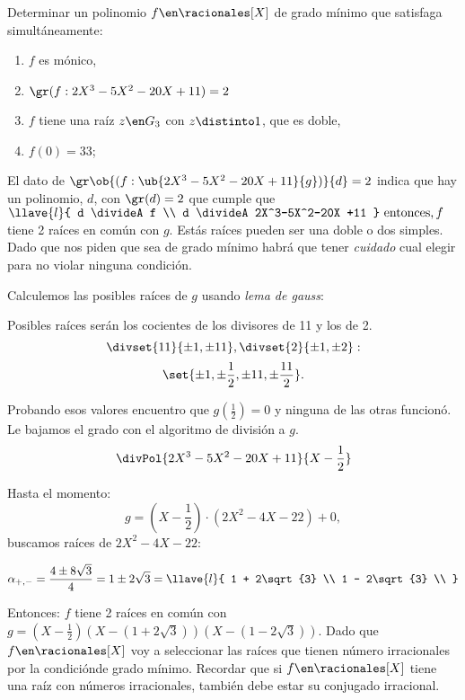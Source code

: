 \begin{enunciado}{\ejExtra}
  Determinar un polinomio $f \en \racionales[X]$ de grado mínimo que satisfaga
  simultáneamente:\par

  \begin{enumerate}[label=$\scriptscriptstyle\blacksquare$]
    \item $f$ es mónico,
    \item $\gr(f:2X^3-5X^2-20X +11) = 2$
    \item $f$ tiene una raíz $z \en G_3$ con $z \distinto 1$, que es doble,
    \item $f(0) = 33$;
  \end{enumerate}
\end{enunciado}

El dato de
$\gr\ob{(f:\ub{2X^3-5X^2-20X +11}{g})}{d} = 2$ indica que hay un polinomio,
$d$, con $\gr(d) = 2$ que cumple que
$
  \llave{l}{
    d \divideA f \\
    d \divideA 2X^3-5X^2-20X +11
  } \text{ entonces,}\, f
$ tiene 2 raíces en común con $g$. Estás raíces pueden ser una doble o dos simples. Dado que nos piden que sea de grado mínimo
habrá que tener \textit{cuidado} cual elegir para no violar ninguna condición.\par

\medskip

Calculemos las posibles raíces de $g$ usando \textit{lema de gauss}:\par
Posibles raíces serán los cocientes de los divisores de 11 y los de 2.
$$
  \divset{11}{\pm1,\pm11}, \divset{2}{\pm1,\pm2}:
$$
$$
  \set{\pm 1,\pm\frac{1}{2},\pm 11, \pm\frac{11}{2}}.
$$

Probando esos valores encuentro que $g(\frac{1}{2}) = 0$ y ninguna de las
otras funcionó. Le bajamos el grado con el algoritmo de división a $g$.
$$
  \divPol{2X^3 - 5X^2 - 20X + 11}{X - \frac{1}{2}}
$$

Hasta el momento:
$$
  g = (X-\frac{1}{2}) \cdot (2X^2 - 4X -22) + 0,
$$
buscamos raíces de $2X^2 - 4X -22$:\par

$$\alpha_{+,-} =
  \frac{4 \pm 8\sqrt{3}}{4} =
  1 \pm 2\sqrt{3} =
  \llave{l}{
    1 + 2\sqrt{3} \\
    1 - 2\sqrt{3} \\
  }
$$

Entonces:
$f$ tiene 2 raíces en común con
$g = (X - \frac{1}{2})(X - (1+2\sqrt{3})) (X - (1-2\sqrt{3})) $. Dado que
$f \en \racionales[X]$  voy a seleccionar las raíces que tienen número irracionales por
la condiciónde grado mínimo. Recordar que si $f \en \racionales[X]$ tiene una raíz con números irracionales,
también debe estar su conjugado irracional.


